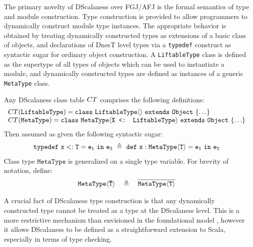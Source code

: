 The primary novelty of DScalaness over FGJ/AFJ is the formal semantics of type and module
construction. Type construction is provided to allow programmers to
dynamically construct module type instances. The appropriate behavior is obtained by treating
dynamically constructed types as extensions of a basic class of objects, and declarations of
DnesT level types via a \texttt{typedef} construct as syntactic sugar for ordinary object
construction. A \texttt{LiftableType} class is defined as the supertype of all types of objects
which can be used to instantiate a module, and dynamically constructed types are defined as
instances of a generic \texttt{MetaType} class.
\begin{definition}
\label{definition-classtable}
Any DScalaness class table ${CT}$ comprises the following definitions:
$$
\begin{array}{l}
{CT}(\texttt{LiftableType}) = \mathtt{class\ \texttt{LiftableType}\langle \rangle\ extends\ Object\ \{\ldots \}}\\
{CT}(\texttt{MetaType}) = \mathtt{class\ \texttt{MetaType}\langle \texttt{X <: LiftableType}\rangle\ extends\ Object\ \{ \ldots  \}}
\end{array}
$$
Then assumed as given the following syntactic sugar:
$$
\jtlet{x}{T}{e_1}{e_2}\ \defeq\ \jdef{x}{\jinst{MetaType}{T}}{e_1}{e_2}
$$
Class type $\texttt{MetaType}$ is generalized on a single type variable. For brevity of
notation, define:
$$
\mathtt{\texttt{MetaType}\langle {\ensuremath{\mathtt{\bar{T}}}} \rangle}\quad \triangleq \quad \overline{\mathtt{MetaType\langle T \rangle}}
$$
\end{definition}
A crucial fact of DScalaness type construction is that any dynamically constructed type cannot be
treated as a type at the DScalaness level. This is a more restrictive mechanism than envisioned
in the foundational model \cite{FramedML,FramedMLworkshop}, however it allows DScalaness to be
defined as a straightforward extension to Scala, especially in terms of type checking.

